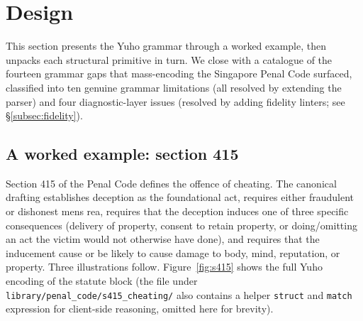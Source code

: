 \section{Design}
\label{sec:design}

This section presents the Yuho grammar through a worked example, then
unpacks each structural primitive in turn. We close with a catalogue of
the fourteen grammar gaps that mass-encoding the Singapore Penal Code
surfaced, classified into ten genuine grammar limitations (all resolved
by extending the parser) and four diagnostic-layer issues (resolved by
adding fidelity linters; see \S\ref{subsec:fidelity}).

\subsection{A worked example: section 415}
\label{subsec:s415}
Section 415 of the Penal Code defines the offence of cheating. The
canonical drafting establishes deception as the foundational act, requires
either fraudulent or dishonest mens rea, requires that the deception
induces one of three specific consequences (delivery of property, consent
to retain property, or doing/omitting an act the victim would not
otherwise have done), and requires that the inducement cause or be likely
to cause damage to body, mind, reputation, or property. Three illustrations
follow. Figure~\ref{fig:s415} shows the full Yuho encoding of the statute
block (the file under \texttt{library/penal\_code/s415\_cheating/} also
contains a helper \texttt{struct} and \texttt{match} expression for
client-side reasoning, omitted here for brevity).

